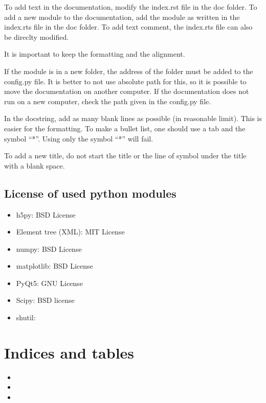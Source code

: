 \documentclass[letterpaper,10pt,english]{sphinxmanual}
\begin{document}
To add text in the documentation, modify the index.rst file in the doc folder. To add a new module to the
documentation, add the module as written in the index.rts file in the doc folder. To add text comment, the index.rts file can also be direclty modified.

It is important to keep the formatting and the alignment.

If the module is in a new folder, the address of the folder must be added to the config.py file.
It is better to not use absolute path for this, so it is possible to move the documentation on another
computer. If the documentation does not run on a new computer, check the path given in the config.py file.

In the docstring, add as many blank lines as possible (in reasonable limit). This is easier for the
formatting. To make a bullet list, one should use a tab and the symbol ``*''.  Using only the symbol ``*'' will
fail.

To add a new title, do not start the title or the line of symbol under the title with a blank space.


\section{License of used python modules}
\label{\detokenize{index:license-of-used-python-modules}}\begin{itemize}
\item {} 
h5py: BSD License

\item {} 
Element tree (XML): MIT License

\item {} 
numpy: BSD License

\item {} 
matplotlib: BSD License

\item {} 
PyQt5: GNU License

\item {} 
Scipy: BSD license

\item {} 
shutil:

\end{itemize}


\chapter{Indices and tables}
\label{\detokenize{index:indices-and-tables}}\begin{itemize}
\item {} 

\item {} 

\item {} 

\end{itemize}
\end{document}
